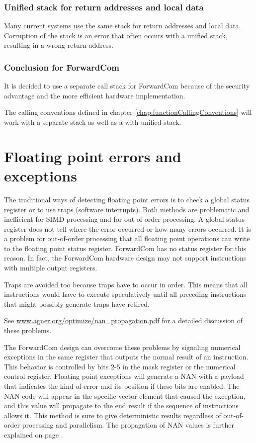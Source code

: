 \documentclass[forwardcom.tex]{subfiles}
\begin{document}
\subsubsection{Unified stack for return addresses and local data} \label{singleStack}
Many current systems use the same stack for return addresses and local data. 
Corruption of the stack is an error that often occurs with a unified stack, resulting in a wrong return address.
\vv

\subsubsection{Conclusion for ForwardCom}
It is decided to use a separate call stack for ForwardCom because of the security advantage and the more efficient hardware implementation. \\
\vv

The calling conventions defined in chapter \ref{chap:functionCallingConventions} will 
work with a separate stack as well as a with unified stack.
\vv


\section{Floating point errors and exceptions}
\label{FloatingPointErrors}
The traditional ways of detecting floating point errors is to check a global status register or to use traps (software interrupts). Both methods are problematic and inefficient for SIMD processing and for out-of-order processing. 
A global status register does not tell where the error occurred or how many errors occurred. It is a problem for out-of-order processing that all floating point operations can write to the floating point status register. 
ForwardCom has no status register for this reason. In fact, the ForwardCom hardware design may not support instructions with multiple output registers. 
\vv

Traps are avoided too because traps have to occur in order. This means that all instructions would have to execute speculatively until all preceding instructions that might possibly generate traps have retired. 
\vv

See 
\href{https://www.agner.org/optimize/nan_propagation.pdf}{www.agner.org/optimize/nan\_propagation.pdf} for a detailed discussion of these problems.
\vv

The ForwardCom design can overcome these problems by signaling numerical exceptions in the same register that outputs the normal result of an instruction. 
This behavior is controlled by bits 2-5 in the mask register or the numerical control register. Floating point exceptions will generate a NAN with a payload that indicates the kind of error and its position if these bits are enabled. The NAN code will appear in the specific vector element that caused the exception, and this value will propagate to the end result if the sequence of instructions allows it. This method is sure to give deterministic results regardless of out-of-order processing and parallelism. The propagation of NAN values is further explained on page \pageref{nanPropagation}.
\vv
\end{document}

